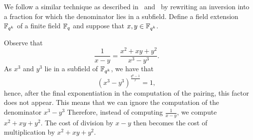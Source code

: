 We follow a similar technique as described in~\cite{2008/lin} and~\cite{2009/deg15}
by rewriting an inversion into a fraction for which the denominator lies in a subfield.
Define a field extension $\mathbb{F}_{q^k}$ of a finite field $\mathbb{F}_{q}$ and suppose that $x,y \in \mathbb{F}_{q^k}$.

Observe that
$$ \frac{1}{x-y} = \frac{x^2 + xy + y^2}{x^3 - y^3}. $$
As $x^3$ and $y^3$ lie in a subfield of $\mathbb{F}_{q^k}$, we have that
\[(x^{3} - y^{3})^{\frac{q^{k}-1}{r}} = 1,\]
hence, after the final exponentiation in the computation of the pairing, this factor does not appear.
This means that we can ignore the computation of the denominator $x^3 - y^3$
Therefore, instead of computing $\frac{1}{x-y}$, we compute $x^2 + xy + y^2$.
The cost of division by $x - y$ then becomes the cost of multiplication by $x^2 + xy + y^2$.


